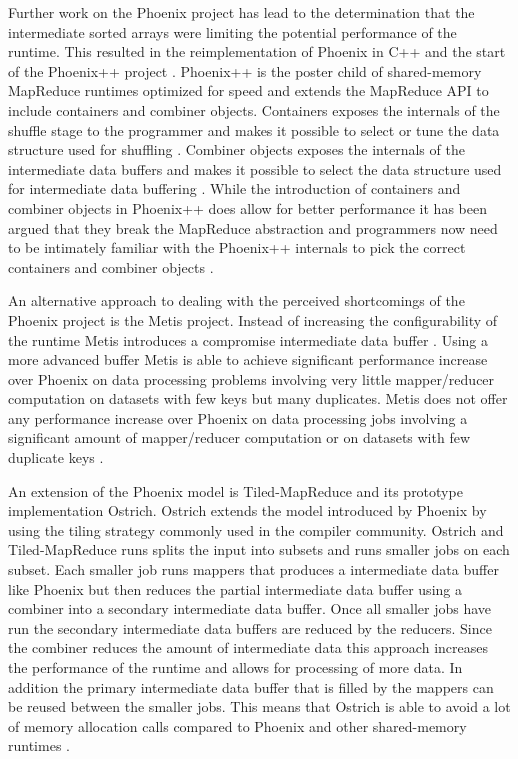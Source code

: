 \documentclass[11pt]{article}       %
\begin{document}
Further work on the Phoenix project has lead to the determination that the intermediate sorted arrays were limiting the potential performance of the runtime.
This resulted in the reimplementation of Phoenix in C++ and the start of the Phoenix++ project \cite{Phoenix++}.
Phoenix++ is the poster child of shared-memory MapReduce runtimes optimized for speed and extends the MapReduce API to include containers and combiner objects.
Containers exposes the internals of the shuffle stage to the programmer and makes it possible to select or tune the data structure used for shuffling \cite{Phoenix++}.
Combiner objects exposes the internals of the intermediate data buffers and makes it possible to select the data structure used for intermediate data buffering \cite{Phoenix++}.
While the introduction of containers and combiner objects in Phoenix++ does allow for better performance it has been argued that they break the MapReduce abstraction and programmers now need to be intimately familiar with the Phoenix++ internals to pick the correct containers and combiner objects \cite{CilkMR}.

An alternative approach to dealing with the perceived shortcomings of the Phoenix project is the Metis project.
Instead of increasing the configurability of the runtime Metis introduces a compromise intermediate data buffer \cite{Metis}.
Using a more advanced buffer Metis is able to achieve significant performance increase over Phoenix on data processing problems involving very little mapper/reducer computation on datasets with few keys but many duplicates.
Metis does not offer any performance increase over Phoenix on data processing jobs involving a significant amount of mapper/reducer computation or on datasets with few duplicate keys \cite{Metis}.

An extension of the Phoenix model is Tiled-MapReduce and its prototype implementation Ostrich.
Ostrich extends the model introduced by Phoenix by using the tiling strategy commonly used in the compiler community.
Ostrich and Tiled-MapReduce runs splits the input into subsets and runs smaller jobs on each subset.
Each smaller job runs mappers that produces a intermediate data buffer like Phoenix but then reduces the partial intermediate data buffer using a combiner into a secondary intermediate data buffer.
Once all smaller jobs have run the secondary intermediate data buffers are reduced by the reducers.
Since the combiner reduces the amount of intermediate data this approach increases the performance of the runtime and allows for processing of more data.
In addition the primary intermediate data buffer that is filled by the mappers can be reused between the smaller jobs.
This means that Ostrich is able to avoid a lot of memory allocation calls compared to Phoenix and other shared-memory runtimes \cite{Ostrich}.
\end{document}
